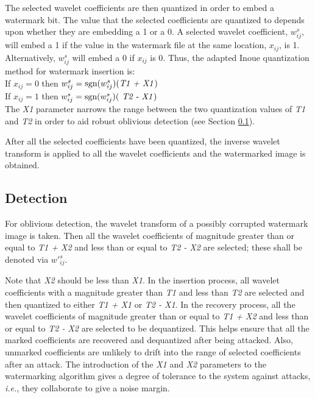 \documentclass[10pt,twocolumn]{article}
\begin{document}
The selected wavelet coefficients are then quantized 
in order to embed a watermark bit. 
The value that the selected coefficients are quantized to depends upon
whether they are embedding a 1 or a 0. A selected wavelet coefficient, $w^{s}_{ij}$,
will embed a 1 if the value in the watermark file at the same location, $x_{ij}$, is 1.
Alternatively, $w^{s}_{ij}$ will embed a 0 if $x_{ij}$ is 0.
Thus, the adapted Inoue quantization method for watermark insertion is: \\
If $x_{ij} = 0$ then $w^{s}_{ij} = \mbox{sgn}(w^{s}_{ij})(\mbox{\emph{T1 + X1}})$ \\
If $x_{ij} = 1$ then $w^{s}_{ij} = \mbox{sgn}(w^{s}_{ij})(\mbox{\emph{ T2 - X1}})$ \\
The \emph{X1} parameter narrows the range between the two quantization values of \emph{T1}
and \emph{T2} in order
to aid robust oblivious detection (see Section \ref{subsec:det}).

After all the selected coefficients have been quantized, the inverse wavelet 
transform is applied to all the wavelet coefficients and the watermarked image
is obtained.


\subsection{Detection}
\label{subsec:det}
For oblivious detection, the wavelet transform of a possibly corrupted
watermark image is taken. Then all the wavelet coefficients of magnitude greater than
or equal to \emph{T1 + X2} and less than or equal to \emph{T2 - X2} are selected;
these shall be denoted via $w'^{s}_{ij}$.

Note that \emph{X2} should be less than \emph{X1}. 
In the insertion process, all wavelet coefficients
with a magnitude greater than \emph{T1} and less than \emph{T2} are selected and then quantized to
either \emph{T1 + X1} or \emph{T2 - X1}. In the recovery process, all the wavelet coefficients
of magnitude greater than or equal to \emph{T1 + X2} and less than or equal to \emph{T2 - X2} are 
selected to be dequantized.
This helps ensure that all the marked coefficients are recovered and dequantized after
being attacked. Also, 
unmarked coefficients are unlikely to drift into the range of selected coefficients
after an attack. The introduction of the \emph{X1} and \emph{X2} parameters to the watermarking algorithm
gives a degree of tolerance to the system against attacks, \emph{i.e.}, they collaborate to give a noise margin.
\end{document}

